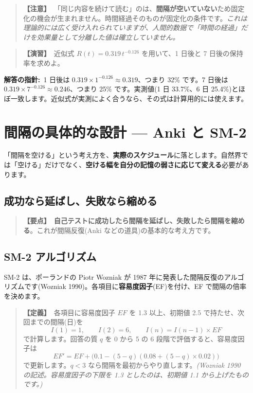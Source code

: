 \documentclass{article}
\begin{document}
\begin{quote}
\textbf{【注意】}\ 「同じ内容を続けて読む」のは、\textbf{間隔が空いていない}ため固定化の機会が生まれません。時間経過そのものが固定化の条件です。\emph{これは理論的には広く受け入れられていますが、人間的数据で「時間の経過」だけを効果量として分離した値は確立していません。}
\end{quote}

\begin{quote}
\textbf{【演習】}\ 近似式 \(R(t) = 0.319\, t^{-0.126}\) を用いて、1 日後と 7 日後の保持率を求めよ。
\end{quote}

\textbf{解答の指針:}\ 1 日後は \(0.319 \times 1^{-0.126} \approx 0.319\)、つまり 32\% です。7 日後は \(0.319 \times 7^{-0.126} \approx 0.246\)、つまり 25\% です。実測値(1 日 33.7\%、6 日 25.4\%)とほぼ一致します。近似式が実測によく合うなら、その式は計算用的には使えます。

\section{間隔の具体的な設計 — Anki と SM-2}

「間隔を空ける」という考え方を、\textbf{実際のスケジュール}に落とします。自然界では「空ける」だけでなく、\textbf{空ける幅を自分の記憶の弱さに応じて変える}必要があります。

\subsection{成功なら延ばし、失敗なら縮める}

\begin{quote}
\textbf{【要点】}\ \textbf{自己テストに成功したら間隔を延ばし、失敗したら間隔を縮める}。これが間隔反復(Anki などの道具)の基本的な考え方です。
\end{quote}

\subsection{SM-2 アルゴリズム}

SM-2 は、ポーランドの Piotr Wozniak が 1987 年に発表した間隔反復のアルゴリズムです(Wozniak 1990)。各項目に\textbf{容易度因子}(EF)を付け、EF で間隔の倍率を決めます。

\begin{quote}
\textbf{【定義】}\ 各項目に容易度因子 \(EF\) を 1.3 以上、初期値 2.5 で持たせ、次回までの間隔(日)を
\[ I(1) = 1, \qquad I(2) = 6, \qquad I(n) = I(n-1) \times EF \]
で計算します。回答の質 \(q\) を 0 から 5 の 6 段階で評価すると、容易度因子は
\[ EF' = EF + \bigl(0.1 - (5-q)(0.08 + (5-q)\times 0.02)\bigr) \]
で更新します。\(q < 3\) なら間隔を最初からやり直します。\emph{(Wozniak 1990 の記述。容易度因子の下限を 1.3 としたのは、初期値 1.1 から上げたものです。)}
\end{quote}
\end{document}
